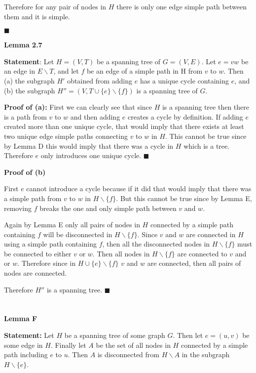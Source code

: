 \documentclass{article}
\newcommand*{\QEDA}{\hfill\ensuremath{\blacksquare}}%
\begin{document}
Therefore for any pair of nodes in $H$ there is only one edge simple path between them and it is simple.

\QEDA


\textbf{Lemma 2.7}

\textbf{Statement}: Let $H = (V,T)$ be a spanning tree of $G = (V,E)$. Let $e = vw$ be an edge in $E \backslash T$, and let $f$ be an edge of a simple path in H from $v$ to $w$. Then (a) the subgraph $H'$ obtained from adding $e$ has a unique cycle containing $e$, and (b) the subgraph $H'' = (V,T \cup \{e\} \backslash \{f\})$ is a spanning tree of $G$.

\textbf{Proof of (a):} First we can clearly see that since $H$ is a spanning tree then there is a path from $v$ to $w$ and then adding $e$ creates a cycle by definition. If adding $e$ created more than one unique cycle, that would imply that there exists at least two unique edge simple paths connecting $v$ to $w$ in $H$. This cannot be true since by Lemma D this would imply that there was a cycle in $H$ which is a tree. Therefore $e$ only introduces one unique cycle.
\QEDA 

\textbf{Proof of (b)} 

First $e$ cannot introduce a cycle because if it did that would imply that there was a simple path from $v$ to $w$ in $H \backslash \{f\}$. But this cannot be true since by Lemma E, removing $f$ breaks the one and only simple path between $v$ and $w$. 

Again by Lemma E only all pairs of nodes in $H$ connected by a simple path containing $f$ will be disconnected in $H \backslash \{f\}$. Since $v$ and $w$ are connected in $H$ using a simple path containing $f$, then all the disconnected nodes in $H \backslash \{f\}$ must be connected to either $v$ or $w$. Then all nodes in $H \backslash \{f\}$ are connected to $v$ and or $w$. Therefore since in $H \cup \{e\} \backslash \{f\}$ $v$ and $w$ are connected, then all pairs of nodes are connected. 

Therefore $H''$ is a spanning tree.
\QEDA

\section{}
\textbf{Lemma F}

\textbf{Statement:} Let $H$ be a spanning tree of some graph $G$. Then let $e = (u,v)$ be some edge in $H$. Finally let $A$ be the set of all nodes in $H$ connected by a simple path including $e$  to $u$. Then $A$ is disconnected from $H \backslash A$ in the subgraph $H \backslash \{e\}$.
\end{document}
